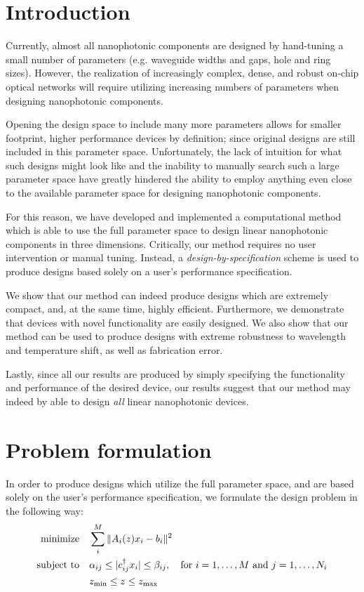 \documentclass[letterpaper,10pt]{article}
\begin{document}
\section{Introduction}
Currently, almost all nanophotonic components are designed 
    by hand-tuning a small number of parameters 
    (e.g. waveguide widths and gaps, hole and ring sizes).
However, the realization of 
    increasingly complex, dense, and robust on-chip optical networks
    will require utilizing increasing numbers of parameters
    when designing nanophotonic components.

Opening the design space to include many more parameters
    allows for smaller footprint, higher performance devices by definition;
    since original designs are still included in this parameter space.
Unfortunately, the lack of intuition for what such designs might look like and
    the inability to manually search such a large parameter space
    have greatly hindered the ability to employ 
    anything even close to the available parameter space
    for designing nanophotonic components.

For this reason, we have developed and implemented a computational method
    which is able to use the full parameter space 
    to design linear nanophotonic components in three dimensions.
Critically, our method requires no user intervention or manual tuning.
Instead, a \emph{design-by-specification} scheme is used 
    to produce designs based solely on a user's performance specification.

We show that our method can indeed produce designs 
    which are extremely compact, and, at the same time, highly efficient.
Furthermore, we demonstrate that devices with novel functionality
    are easily designed.
We also show that our method can be used to produce designs
    with extreme robustness to wavelength and temperature shift,
    as well as fabrication error.

Lastly, since all our results are produced by simply specifying
    the functionality and performance of the desired device,
    our results suggest that our method may indeed by able
    to design \emph{all} linear nanophotonic devices.

\section{Problem formulation}
In order to produce designs which utilize the full parameter space,
    and are based solely on the user's performance specification,
    we formulate the design problem in the following way:
\begin{subequations}\begin{align}
    \operatorname*{\text{minimize}\quad} & \sum_i^M \|A_i(z)x_i - b_i\|^2 \\
    \text{subject to}\quad & \alpha_{ij} \le |c_{ij}^\dagger x_i| \le \beta_{ij}, \quad
        \text{for $i = 1, \ldots, M$ and $j = 1, \ldots, N_i$} \\
        &   z_\text{min} \le z \le z_\text{max}
\end{align} \label{problem}\end{subequations}
\end{document}

